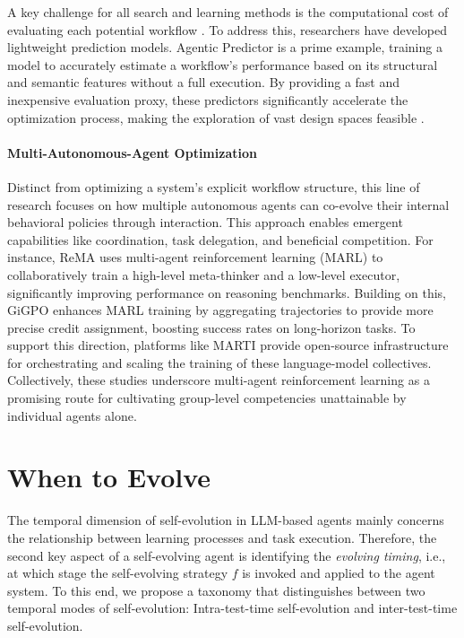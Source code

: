\documentclass[10pt]{article} %
\begin{document}
A key challenge for all search and learning methods is the computational cost of evaluating each potential workflow \citep{shang2025agentsquare}. To address this, researchers have developed lightweight prediction models. Agentic Predictor \citep{trirat2025agentic} is a prime example, training a model to accurately estimate a workflow's performance based on its structural and semantic features without a full execution. By providing a fast and inexpensive evaluation proxy, these predictors significantly accelerate the optimization process, making the exploration of vast design spaces feasible \citep{zhang2025gnns}.


\paragraph{Multi-Autonomous-Agent Optimization}
Distinct from optimizing a system's explicit workflow structure, this line of research focuses on how multiple autonomous agents can co-evolve their internal behavioral policies through interaction. This approach enables emergent capabilities like coordination, task delegation, and beneficial competition. For instance, ReMA \citep{wan2025remalearningmetathinkllms} uses multi-agent reinforcement learning (MARL) to collaboratively train a high-level meta-thinker and a low-level executor, significantly improving performance on reasoning benchmarks. Building on this, GiGPO \citep{feng2025groupingrouppolicyoptimizationllm} enhances MARL training by aggregating trajectories to provide more precise credit assignment, boosting success rates on long-horizon tasks. To support this direction, platforms like MARTI \citep{liao2025marftmultiagentreinforcementfinetuning} provide open-source infrastructure for orchestrating and scaling the training of these language-model collectives. Collectively, these studies underscore multi-agent reinforcement learning as a promising route for cultivating group-level competencies unattainable by individual agents alone.





\section{When to Evolve}
\label{sec:when}
The temporal dimension of self-evolution in LLM-based agents mainly concerns the relationship between learning processes and task execution. Therefore, the second key aspect of a self-evolving agent is identifying the \textit{evolving timing}, i.e., at which stage the self-evolving strategy $f$ is invoked and applied to the agent system. To this end, we propose a taxonomy that distinguishes between two temporal modes of self-evolution: Intra-test-time self-evolution and inter-test-time self-evolution.
\end{document}
